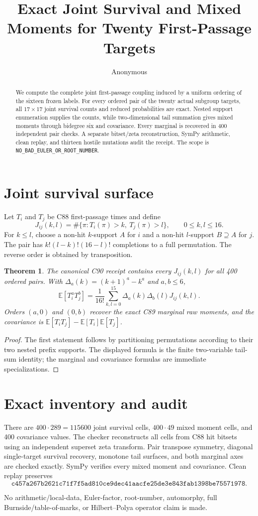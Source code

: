 \documentclass[10pt]{article}
\title{Exact Joint Survival and Mixed Moments for Twenty First-Passage Targets}
\author{Anonymous}
\date{}
\newtheorem{theorem}{Theorem}
\begin{document}
\maketitle
\begin{abstract}
We compute the complete joint first-passage coupling induced by a uniform
ordering of the sixteen frozen labels.  For every ordered pair of the twenty
actual subgroup targets, all $17\times17$ joint survival counts and reduced
probabilities are exact.  Nested support enumeration supplies the counts,
while two-dimensional tail summation gives mixed moments through bidegree
six and covariance.  Every marginal is recovered in 400 independent pair
checks.  A separate bitset/zeta reconstruction, SymPy arithmetic, clean
replay, and thirteen hostile mutations audit the receipt.  The scope is
\texttt{NO\_BAD\_EULER\_OR\_ROOT\_NUMBER}.
\end{abstract}

\section{Joint survival surface}
Let $T_i$ and $T_j$ be C88 first-passage times and define
\[
J_{ij}(k,l)=\#\{\pi:T_i(\pi)>k,\ T_j(\pi)>l\},\qquad 0\leq k,l\leq16.
\]
For $k\leq l$, choose a non-hit $k$-support $A$ for $i$ and a non-hit
$l$-support $B\supseteq A$ for $j$.  The pair has
$k!(l-k)!(16-l)!$ completions to a full permutation.  The reverse order is
obtained by transposition.

\begin{theorem}
The canonical C90 receipt contains every $J_{ij}(k,l)$ for all 400 ordered
pairs.  With $\Delta_a(k)=(k+1)^a-k^a$ and $a,b\leq6$,
\[
 \mathbb E[T_i^aT_j^b]=\frac1{16!}\sum_{k,l=0}^{15}
 \Delta_a(k)\Delta_b(l)J_{ij}(k,l).
\]
Orders $(a,0)$ and $(0,b)$ recover the exact C89 marginal raw moments, and
the covariance is $\mathbb E[T_iT_j]-\mathbb E[T_i]\mathbb E[T_j]$.
\end{theorem}
\begin{proof}
The first statement follows by partitioning permutations according to their
two nested prefix supports.  The displayed formula is the finite
two-variable tail-sum identity; the marginal and covariance formulas are
immediate specializations.
\end{proof}

\section{Exact inventory and audit}
There are $400\cdot289=115600$ joint survival cells, $400\cdot49$ mixed
moment cells, and 400 covariance values.  The checker reconstructs all cells
from C88 hit bitsets using an independent superset zeta transform.  Pair
transpose symmetry, diagonal single-target survival recovery, monotone tail
surfaces, and both marginal axes are checked exactly.  SymPy verifies every
mixed moment and covariance.  Clean replay preserves
\[
\texttt{c457a267b2621c71f7f5ad810ce9dec41aacfe25de3e843fab1398be75571978}.
\]

No arithmetic/local-data, Euler-factor, root-number, automorphy,
full Burnside/table-of-marks, or Hilbert--Polya operator claim is made.
\end{document}
